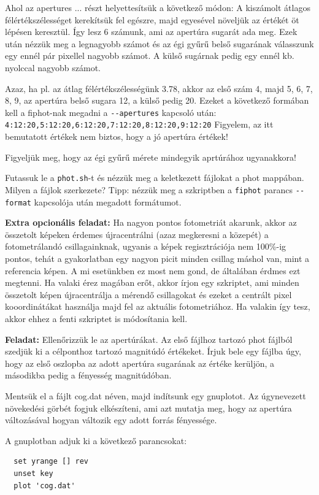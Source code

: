 \documentclass{article}
\begin{document}
Ahol az apertures ... részt helyettesítsük a következő módon:
A kiszámolt átlagos félértékszélességet kerekítsük fel egészre, majd egyesével
növeljük az értékét öt lépésen keresztül. Így lesz 6 számunk, ami az apertúra
sugarát ada meg. Ezek után nézzük meg a legnagyobb számot és az égi gyűrű belső
sugarának válasszunk egy ennél pár pixellel nagyobb számot. A külső sugárnak
pedig egy ennél kb. nyolccal nagyobb számot.

Azaz, ha pl. az átlag félértékszélességünk 3.78, akkor az első szám 4, majd 5,
6, 7, 8, 9, az apertúra belső sugara 12, a külső pedig 20.
Ezeket a következő formában kell a fiphot-nak megadni a \verb+--apertures+ kapcsoló után: \verb+4:12:20,5:12:20,6:12:20,7:12:20,8:12:20,9:12:20+
Figyelem, az itt bemutatott értékek nem biztos, hogy a jó apertúra értékek!

Figyeljük meg, hogy az égi gyűrű mérete mindegyik aprtúrához ugyanakkora!

Futassuk le a \verb+phot.sh+-t és nézzük meg a keletkezett fájlokat a phot mappában.
Milyen a fájlok szerkezete? Tipp: nézzük meg a szkriptben a \verb+fiphot+ parancs
\verb+--format+ kapcsolója után megadott formátumot.


{\bf Extra opcionális feladat:}
Ha nagyon pontos fotometriát akarunk, akkor az összetolt képeken érdemes
újracentrálni (azaz megkeresni a közepét) a fotometrálandó csillagainknak,
ugyanis a képek regisztrációja nem 100\%-ig pontos, tehát a gyakorlatban egy
nagyon picit minden csillag máshol van, mint a referencia képen. A mi
esetünkben ez most nem gond, de általában érdmes ezt megtenni.
Ha valaki érez magában erőt, akkor írjon egy szkriptet, ami minden összetolt
képen újracentrálja a mérendő csillagokat és ezeket a centrált pixel
kooordinátákat használja majd fel az aktuális fotometriához. Ha valakin így
tesz, akkor ehhez a fenti szkriptet is módosítania kell.


{\bf Feladat:}
Ellenőrizzük le az apertúrákat.
Az első fájlhoz tartozó phot fájlból szedjük ki a célponthoz tartozó
magnitúdó értékeket. Írjuk bele egy fájlba úgy, hogy az első oszlopba az adott
apertúra sugarának az értéke kerüljön, a másodikba pedig a fényesség
magnitúdóban.

Mentsük el a fájlt cog.dat néven, majd indítsunk egy gnuplotot. Az úgynevezett
növekedési görbét fogjuk elkészíteni, ami azt mutatja meg, hogy az apertúra
változásával hogyan változik egy adott forrás fényessége.

A gnuplotban adjuk ki a következő parancsokat:
\begin{verbatim}
  set yrange [] rev
  unset key
  plot 'cog.dat'
\end{verbatim}
\end{document}
